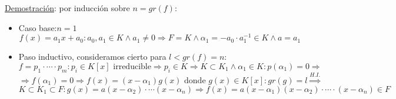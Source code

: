 \documentclass[10pt,a4paper,openright]{book}
\theoremstyle{break}
\begin{document}
\underline{Demostración}: por inducción sobre $n=gr(f)$:
\begin{itemize}
\item Caso base:$n=1$
$$f(x)=a_1x+a_0: a_0,a_1\in K\wedge a_1\neq 0\Rightarrow F=K\wedge \alpha_1=-a_0\cdot a_1^{-1}\in K\wedge a=a_1$$
\item Paso inductivo, consideramos cierto para $l<gr(f)=n$:
$$f=p_1\cdot \cdots \cdot p_m: p_i\in K[x] \mbox{ irreducible}\Rightarrow p_i\in K\Rightarrow K\subset K_1 \wedge \alpha_1\in K: p(\alpha_1)=0\Rightarrow$$
$$\Rightarrow f(\alpha_1)=0\Rightarrow f(x)=(x-\alpha_1)g(x)\mbox{ donde }g(x)\in K[x]: gr(g)=l\stackrel{H.I.}{\Rightarrow}$$
$$K\subset K_1\subset F: g(x)=a(x-\alpha_2)\cdot \cdots(x-\alpha_n)\Rightarrow f(x)=a(x-\alpha_1)(x-\alpha_2)\cdot \cdots \cdot (x-\alpha_n)\in F$$
\end{itemize}
\end{document}
